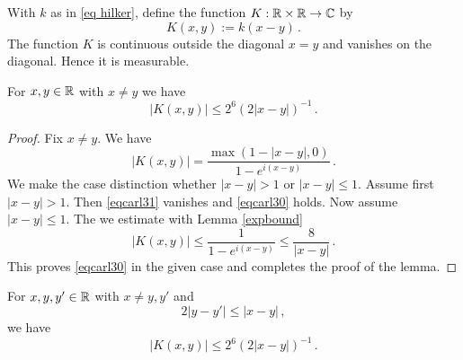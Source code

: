 With $k$ as in \eqref{eq hilker}, define
the function $K:\mathbb{R}\times \mathbb{R}\to \mathbb{C}$ by
\begin{equation}
    K(x,y):=k(x-y)\, .
\end{equation}
The function $K$ is continuous outside the diagonal
$x=y$ and vanishes on the diagonal. Hence it is measurable.

\begin{lemma}
    For $x,y\in \mathbb{R}$ with $x\neq y$ we have
    \begin{equation}\label{eqcarl30}
        |K(x,y)|\le 2^6(2|x-y|)^{-1}\, .
    \end{equation}
\end{lemma}
\begin{proof}
    Fix $x\neq y$. We have
\begin{equation}\label{eqcarl31}
|K(x,y)|=\frac {\max (1-|x-y|, 0)}{1-e^{i(x-y)}}\, .
\end{equation}
We make the case distinction whether
$|x-y|>1$ or $|x-y|\le 1$.
Assume first $|x-y|>1$. Then \eqref{eqcarl31}
vanishes and \eqref{eqcarl30} holds.
Now assume $|x-y|\le 1$. The we estimate
with Lemma \ref{expbound}
\begin{equation}\label{eqcarl31}
|K(x,y)|\le \frac {1}{1-e^{i(x-y)}}\le \frac 8{|x-y|}\, .
\end{equation}
This proves \eqref{eqcarl30} in the given case and completes the proof of the lemma.
\end{proof}

\begin{lemma}
    For $x,y,y'\in \mathbb{R}$ with $x\neq y,y'$ and
    \begin{equation}
        2|y-y'|\le |x-y|\, ,
    \end{equation}
    we have
    \begin{equation}\label{eqcarl30}
        |K(x,y)|\le 2^6(2|x-y|)^{-1}\, .
    \end{equation}
\end{lemma}

\printbibliography
